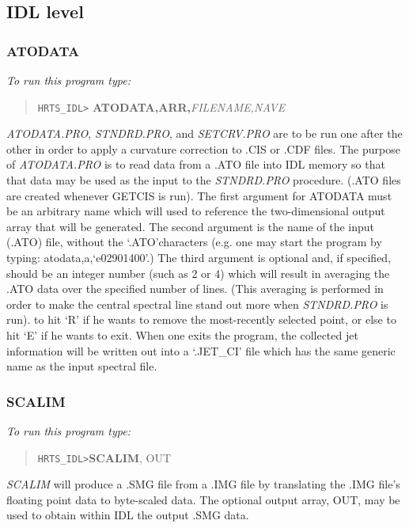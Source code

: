 \subsection{IDL level}

\subsubsection{ATODATA}

{\em To run this program type:}

\begin{quote}
      {\tt HRTS\_IDL>} {\bf ATODATA,ARR,}{\it FILENAME,NAVE}
\end{quote}
{\em ATODATA.PRO}, {\em STNDRD.PRO}, and {\em SETCRV.PRO} are to be run one
after the
   other in order to apply a curvature correction to .CIS or .CDF files.
   The purpose of {\em ATODATA.PRO} is to read data from a .ATO file into IDL
   memory so that that data may be used as the input to the {\em STNDRD.PRO}
   procedure.  (.ATO files are created whenever GETCIS is run).  The first
   argument for ATODATA must be an arbitrary name which will used to
   reference the two-dimensional output array that will be generated.  The
   second argument is the name of the input (.ATO) file, without the
   `.ATO'characters (e.g. one may start the program by typing:
   atodata,a,`e02901400'.) The third argument is
   optional and, if specified, should be an integer number (such as 2 or
   4) which will result in averaging the .ATO data over the specified
   number of lines.  (This averaging is performed in order to make the
   central spectral line stand out more when {\em STNDRD.PRO} is run).
   to hit `R' if he wants to remove the most-recently selected point, or
   else to hit `E' if he wants to exit.  When one exits the program, the
   collected jet information will be written out into a `.JET\_CI' file
   which has the same generic name as the input spectral file.

\subsubsection{SCALIM}

{\em To run this program type:}
\begin{quote}
     {\tt HRTS\_IDL>}{\bf SCALIM}, OUT
\end{quote}
{\em SCALIM} will produce a .SMG file from a .IMG file by translating the
   .IMG file's floating point data to byte-scaled data.  The optional
   output array, OUT, may be used to obtain within IDL the output .SMG
   data.

